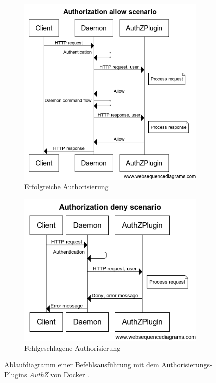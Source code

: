 \documentclass[../main.tex]{subfiles}
\begin{document}
    \begin{figure}
      \centering
      \begin{subfigure}{.5\textwidth}
        \centering
        \includegraphics[width=1.0\linewidth]{./images/sec_authzAllow.png}
        \caption{Erfolgreiche Authorisierung}
        \label{fig:sec_authzAllow}
      \end{subfigure}%
      \begin{subfigure}{.5\textwidth}
        \centering
        \includegraphics[width=1.0\linewidth]{./images/sec_authzDeny.png}
        \caption{Fehlgeschlagene Authorisierung}
        \label{fig:sec_authzDeny}
      \end{subfigure}
      \caption{Ablaufdiagramm einer Befehlsausführung mit dem Authorisierungs-Plugins \emph{AuthZ} von Docker \cite{githubAuthZExtended}.}
      \label{fig:sec_authz}
    \end{figure}
\end{document}
